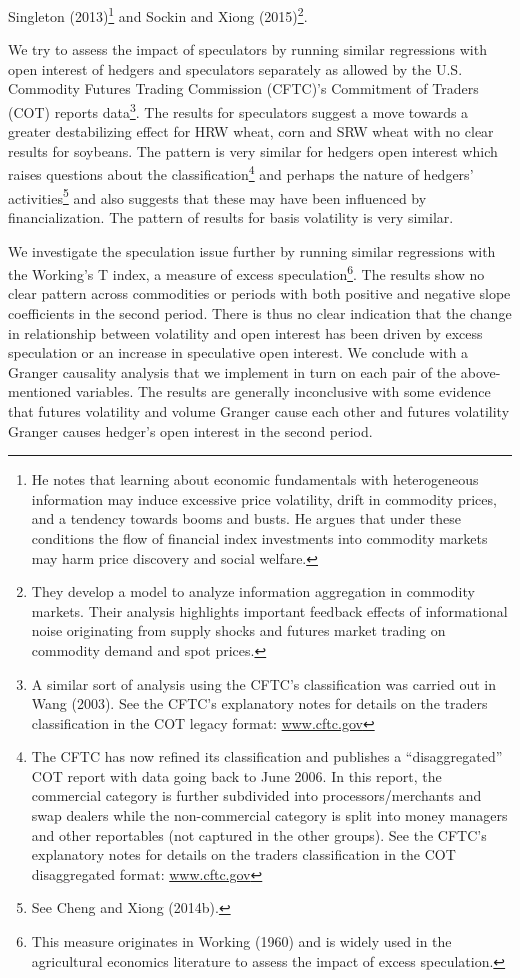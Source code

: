 \documentclass[]{elsarticle} %
\begin{document}
Singleton (2013)\footnote{He notes that learning about economic
  fundamentals with heterogeneous information may induce excessive price
  volatility, drift in commodity prices, and a tendency towards booms
  and busts. He argues that under these conditions the flow of financial
  index investments into commodity markets may harm price discovery and
  social welfare.} and Sockin and Xiong (2015)\footnote{They develop a
  model to analyze information aggregation in commodity markets. Their
  analysis highlights important feedback effects of informational noise
  originating from supply shocks and futures market trading on commodity
  demand and spot prices.}.

We try to assess the impact of speculators by running similar
regressions with open interest of hedgers and speculators separately as
allowed by the U.S. Commodity Futures Trading Commission (CFTC)'s
Commitment of Traders (COT) reports data\footnote{A similar sort of
  analysis using the CFTC's classification was carried out in Wang
  (2003). See the CFTC's explanatory notes for details on the traders
  classification in the COT legacy format:
  \href{http://www.cftc.gov/MarketReports/CommitmentsofTraders/ExplanatoryNotes/index.htm}{www.cftc.gov}}.
The results for speculators suggest a move towards a greater
destabilizing effect for HRW wheat, corn and SRW wheat with no clear
results for soybeans. The pattern is very similar for hedgers open
interest which raises questions about the classification\footnote{The
  CFTC has now refined its classification and publishes a
  ``disaggregated'' COT report with data going back to June 2006. In
  this report, the commercial category is further subdivided into
  processors/merchants and swap dealers while the non-commercial
  category is split into money managers and other reportables (not
  captured in the other groups). See the CFTC's explanatory notes for
  details on the traders classification in the COT disaggregated format:
  \href{http://www.cftc.gov/MarketReports/CommitmentsofTraders/DisaggregatedExplanatoryNotes/index.htm}{www.cftc.gov}}
and perhaps the nature of hedgers' activities\footnote{See Cheng and
  Xiong (2014b).} and also suggests that these may have been influenced
by financialization. The pattern of results for basis volatility is very
similar.

We investigate the speculation issue further by running similar
regressions with the Working's T index, a measure of excess
speculation\footnote{This measure originates in Working (1960) and is
  widely used in the agricultural economics literature to assess the
  impact of excess speculation.}. The results show no clear pattern
across commodities or periods with both positive and negative slope
coefficients in the second period. There is thus no clear indication
that the change in relationship between volatility and open interest has
been driven by excess speculation or an increase in speculative open
interest. We conclude with a Granger causality analysis that we
implement in turn on each pair of the above-mentioned variables. The
results are generally inconclusive with some evidence that futures
volatility and volume Granger cause each other and futures volatility
Granger causes hedger's open interest in the second period.
\end{document}
